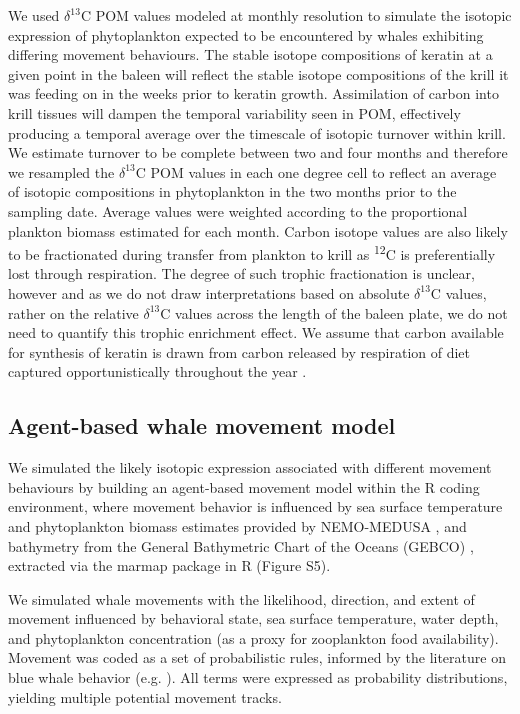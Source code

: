 \documentclass[a4paper,12pt]{article}
\begin{document}
We used \(\delta^{13}\)C POM values modeled at monthly resolution to simulate the isotopic expression of phytoplankton expected to be encountered by whales exhibiting differing movement behaviours. 
The stable isotope compositions of keratin at a given point in the baleen will reflect the stable isotope compositions of the krill it was feeding on in the weeks prior to keratin growth. 
Assimilation of carbon into krill tissues will dampen the temporal variability seen in POM, effectively producing a temporal average over the timescale of isotopic turnover within krill. 
We estimate turnover to be complete between two and four months and therefore we resampled the \(\delta^{13}\)C POM values in each one degree cell to reflect an average of isotopic compositions in phytoplankton in the two months prior to the sampling date. 
Average values were weighted according to the proportional plankton biomass estimated for each month. 
Carbon isotope values are also likely to be fractionated during transfer from plankton to krill as \textsuperscript{12}C is preferentially lost through respiration. 
The degree of such trophic fractionation is unclear, however and as we do not draw interpretations based on absolute \(\delta^{13}\)C values, rather on the relative \(\delta^{13}\)C values across the length of the baleen plate, we do not need to quantify this trophic enrichment effect. 
We assume that carbon available for synthesis of keratin is drawn from carbon released by respiration of diet captured opportunistically throughout the year \citep{baines2017autumn,silva2013north,visser2011timing,busquets2017estimating, lesage2017foraging, bailey2009behavioural, branch2007, huckgaete2018}.

\subsection{Agent-based whale movement model}
\label{agent-based-whale-movement-model}

We simulated the likely isotopic expression associated with different movement behaviours by building an agent-based movement model within the R coding environment, where movement behavior is influenced by sea surface temperature and phytoplankton biomass estimates provided by NEMO-MEDUSA \citep{yool2013medusa}, and bathymetry from the General Bathymetric Chart of the Oceans (GEBCO) \citep{bathy}, extracted via the marmap package in R \citep{marmap} (Figure S5).

We simulated whale movements with the likelihood, direction, and extent of movement influenced by behavioral state, sea surface temperature, water depth, and phytoplankton concentration (as a proxy for zooplankton food availability).
Movement was coded as a set of probabilistic rules, informed by the literature on blue whale behavior (e.g. \citep{handbook}).
All terms were expressed as probability distributions, yielding multiple potential movement tracks.
\end{document}
